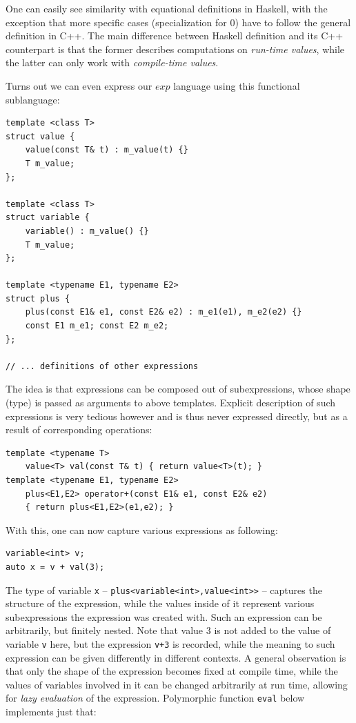 \documentclass[preprint]{sigplanconf}
\makeatletter
\DeclareRobustCommand{\code}[1]{{\lstinline[breaklines=false,escapechar=@]{#1}}}
\makeatother
\begin{document}
\noindent
One can easily see similarity with equational definitions in Haskell, with the 
exception that more specific cases (specialization for 0) have to follow the 
general definition in C++. The main difference between Haskell definition and 
its C++ counterpart is that the former describes computations on \emph{run-time 
values}, while the latter can only work with \emph{compile-time values}.

Turns out we can even express our $exp$ language using this functional 
sublanguage:

\begin{lstlisting}
template <class T>
struct value {
    value(const T& t) : m_value(t) {}
    T m_value;
};

template <class T>
struct variable {
    variable() : m_value() {}
    T m_value;
};

template <typename E1, typename E2>
struct plus {
    plus(const E1& e1, const E2& e2) : m_e1(e1), m_e2(e2) {}
    const E1 m_e1; const E2 m_e2;
};

// ... definitions of other expressions
\end{lstlisting}

\noindent The idea is that expressions can be composed out of subexpressions, 
whose shape (type) is passed as arguments to above templates. Explicit 
description of such expressions is very tedious however and is thus never 
expressed directly, but as a result of corresponding operations: 

\begin{lstlisting}[keepspaces,columns=flexible]
template <typename T>
    value<T> val(const T& t) { return value<T>(t); }
template <typename E1, typename E2>
    plus<E1,E2> operator+(const E1& e1, const E2& e2)
    { return plus<E1,E2>(e1,e2); }
\end{lstlisting}

\noindent With this, one can now capture various expressions as following:

\begin{lstlisting}
variable<int> v;
auto x = v + val(3);
\end{lstlisting}

\noindent The type of variable \code{x} -- \code{plus<variable<int>,value<int>>}
 -- captures the structure of the expression, while the values inside of it 
represent various subexpressions the expression was created with. Such an 
expression can be arbitrarily, but finitely nested. Note that value 3 is not 
added to the value of variable \code{v} here, but the expression \code{v+3} is 
recorded, while the meaning to such expression can be given differently in 
different contexts. A general observation is that only the shape of the 
expression becomes fixed at compile time, while the values of variables involved 
in it can be changed arbitrarily at run time, allowing for \emph{lazy 
evaluation} of the expression. Polymorphic function \code{eval} below implements 
just that:
\end{document}
